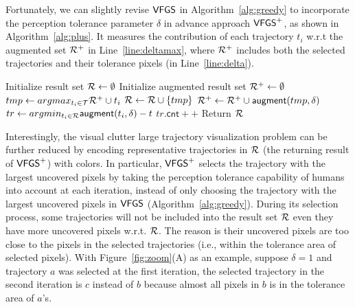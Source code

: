 Fortunately, we can slightly revise $\mathsf{VFGS}$ in Algorithm~\ref{alg:greedy} to incorporate the perception tolerance parameter $\delta$ in advance approach $\mathsf{VFGS}^{+}$, as shown in Algorithm~\ref{alg:plus}.
It measures the contribution of each trajectory $t_i$ w.r.t the augmented set $\mathcal{R}^{+}$ in Line~\ref{line:deltamax},
where $\mathcal{R}^{+}$ includes both the selected trajectories and their tolerance pixels (in Line~\ref{line:delta}).

%
\begin{algorithm}
    \caption{$\avats(\D,k=\alpha |\D|,\delta)$} \label{alg:plus}
    \begin{algorithmic}[1]
    \State Initialize result set $\mathcal{R} \leftarrow \emptyset$
    \State Initialize augmented result set $\mathcal{R}^{+} \leftarrow \emptyset$
        \State $tmp \leftarrow argmax_{t_i \in \mathcal{T}} \mathcal{R}^{+} \cup t_i$ \label{line:deltamax}
        \State $\mathcal{R} \leftarrow \mathcal{R} \cup \{ tmp \}$
        \State $\mathcal{R}^{+} \leftarrow \mathcal{R}^{+} \cup \mathsf{augment}(tmp, \delta)$\label{line:delta}
    \EndWhile
      \label{line:s}
        \State $tr \leftarrow argmin_{t_i \in \mathcal{R}}{\mathsf{augment}(t_i, \delta) - t}$
        \State $tr.\mathsf{cnt}++$ \label{line:e}
    \EndFor
    \State Return $\mathcal{R}$
    \end{algorithmic}
\end{algorithm}


Interestingly, the visual clutter large trajectory visualization problem can be further reduced
by encoding representative trajectories in $\mathcal{R}$ (the returning result of $\mathsf{VFGS}^{+}$) with colors.
In particular, $\mathsf{VFGS}^{+}$ selects the trajectory with the largest uncovered pixels by taking the perception tolerance capability of humans into account at each iteration,
instead of only choosing the trajectory with the largest uncovered pixels in $\mathsf{VFGS}$ (Algorithm~\ref{alg:greedy}).
During its selection process, some trajectories will not be included into the result set $\mathcal{R}$ even they have more uncovered pixels w.r.t. $\mathcal{R}$.
The reason is their uncovered pixels are too close to the pixels in the selected trajectories (i.e., within the tolerance area of selected pixels).
With Figure~\ref{fig:zoom}(A) as an example, suppose $\delta=1$ and trajectory $a$ was selected at the first iteration,
the selected trajectory in the second iteration is $c$ instead of $b$ because almost all pixels in $b$ is in the tolerance area of $a$'s.

